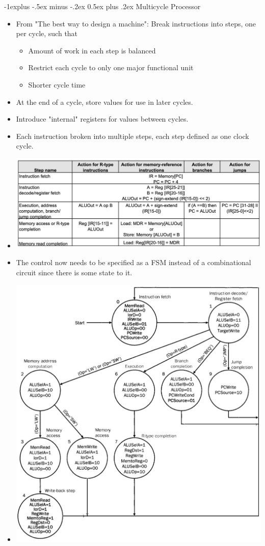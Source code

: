 \documentclass[8pt, landscape]{extarticle}
\makeatletter
\renewcommand{\subsection}{\@startsection{subsection}{2}{0mm}%
  {-1explus -.5ex minus -.2ex}%
  {0.5ex plus .2ex}%
{\normalfont\normalsize\bfseries}}
\makeatother
\begin{document}
\begin{multicols*}{4}
  \subsection{Multicycle Processor}
      \begin{itemize}
        \item From "The best way to design a machine": Break instructions into steps, one per cycle, such that
        \begin{itemize}
          \item Amount of work in each step is balanced
          \item Restrict each cycle to only one major functional unit
          \item Shorter cycle time
        \end{itemize}
        \item At the end of a cycle, store values for use in later cycles.
        \item Introduce "internal" registers for values between cycles.
        \item Each instruction broken into multiple steps, each step defined as one clock cycle.
        \item \includegraphics[width=\linewidth]{multicycle_5_stages.jpg}
        \item The control now needs to be specified as a FSM instead of a combinational circuit since there is some state to it.
        \item \includegraphics[width=\linewidth]{control_fsm.jpg}

\end{itemize}
\end{multicols*}
\end{document}
